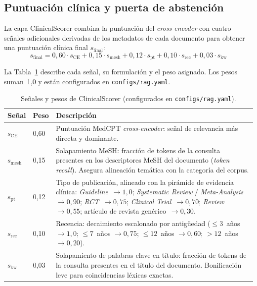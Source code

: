 \documentclass[11pt,a4paper,spanish]{book}
\numberwithin{equation}{chapter}
\numberwithin{figure}{chapter}
\begin{document}
\subsection{Puntuación clínica y puerta de abstención}
\label{sec:c5_clinical_scorer}

La capa ClinicalScorer combina la puntuación del \textit{cross-encoder} con cuatro señales adicionales derivadas de los metadatos de cada documento para obtener una puntuación clínica final $s_{\text{final}}$:
\begin{equation}
  s_{\text{final}} = 0{,}60\cdot s_{\mathrm{CE}} + 0{,}15\cdot s_{\mathrm{mesh}} + 0{,}12\cdot s_{\mathrm{pt}} + 0{,}10\cdot s_{\mathrm{rec}} + 0{,}03\cdot s_{\mathrm{kw}}
\end{equation}

La Tabla~\ref{tab:c5_clinical_scorer} describe cada señal, su formulación y el peso asignado. Los pesos suman~1{,}0 y están configurados en \texttt{configs/rag.yaml}.

\begin{table}[h]
\centering
\small
\begin{tabular}{|p{}|p{}|p{}|}
\hline
\textbf{Señal} & \textbf{Peso} & \textbf{Descripción} \\
\hline
$s_{\mathrm{CE}}$ & 0{,}60 & Puntuación MedCPT \textit{cross-encoder}: señal de relevancia más directa y dominante. \\
\hline
$s_{\mathrm{mesh}}$ & 0{,}15 & Solapamiento MeSH: fracción de tokens de la consulta presentes en los descriptores MeSH del documento (\textit{token recall}). Asegura alineación temática con la categoría del corpus. \\
\hline
$s_{\mathrm{pt}}$ & 0{,}12 & Tipo de publicación, alineado con la pirámide de evidencia clínica: \textit{Guideline}~$\to 1{,}0$; \textit{Systematic Review} / \textit{Meta-Analysis}~$\to 0{,}90$; \textit{RCT}~$\to 0{,}75$; \textit{Clinical Trial}~$\to 0{,}70$; \textit{Review}~$\to 0{,}55$; artículo de revista genérico~$\to 0{,}30$. \\
\hline
$s_{\mathrm{rec}}$ & 0{,}10 & Recencia: decaimiento escalonado por antigüedad ($\leq 3$~años $\to 1{,}0$; $\leq 7$~años $\to 0{,}75$; $\leq 12$~años $\to 0{,}60$; $> 12$~años $\to 0{,}20$). \\
\hline
$s_{\mathrm{kw}}$ & 0{,}03 & Solapamiento de palabras clave en título: fracción de tokens de la consulta presentes en el título del documento. Bonificación leve para coincidencias léxicas exactas. \\
\hline
\end{tabular}
\caption{Señales y pesos de ClinicalScorer (configurados en \texttt{configs/rag.yaml}).}
\label{tab:c5_clinical_scorer}
\end{table}
\end{document}
